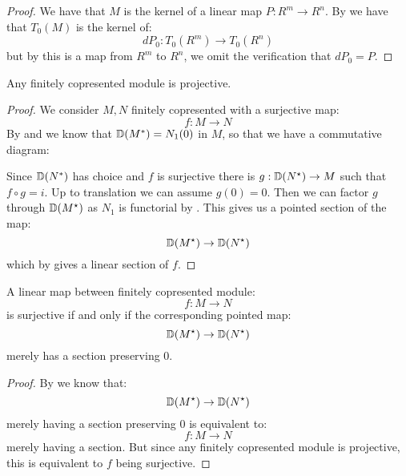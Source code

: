 \begin{proof}
We have that $M$ is the kernel of a linear map $P:R^m\to R^n$. By  we have that $T_0(M)$ is the kernel of:
\[dP_0:T_0(R^m)\to T_0(R^n)\]
but by  this is a map from $R^m$ to $R^n$, we omit the verification that $dP_0 = P$.
\end{proof}

\begin{lemma}
Any finitely copresented module is projective.
\end{lemma}

\begin{proof}
We consider $M,N$ finitely copresented with a surjective map:
\[f:M\to N\]
By  and  we know that $\mathbb{D}(M^*) = N_1(0)$ in $M$, so that we have a commutative diagram:
\begin{center}
\end{center}
Since $\mathbb{D}(N^*)$ has choice and $f$ is surjective there is $g:\mathbb{D}(N^\star)\to M$ such that $f\circ g = i$. Up to translation we can assume $g(0) = 0$.
Then we can factor $g$ through $\mathbb{D}(M^\star)$ as $N_1$ is functorial by . This gives us a pointed section of the map:
\[\mathbb{D}(M^\star) \to \mathbb{D}(N^\star)\]
which by  gives a linear section of $f$.
\end{proof}

\begin{lemma}\label{neighborhood-tangent-correspondence-smooth}
A linear map between finitely copresented module:
\[f:M\to N\]
is surjective if and only if the corresponding pointed map:
\[\mathbb{D}(M^\star) \to \mathbb{D}(N^\star)\]
merely has a section preserving $0$.
\end{lemma}

\begin{proof}
By  we know that:
\[\mathbb{D}(M^\star) \to \mathbb{D}(N^\star)\]
merely having a section preserving $0$ is equivalent to:
\[f:M\to N\]
merely having a section. But since any finitely copresented module is projective, this is equivalent to $f$ being surjective.
\end{proof}







